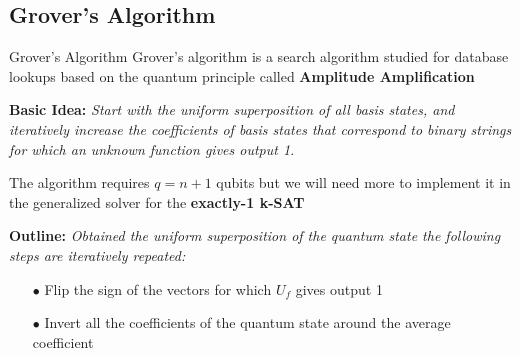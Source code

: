 	\subsection{Grover's Algorithm}
		\begin{frame}{Grover's Algorithm}
			\small
			Grover's algorithm is a search algorithm studied for database lookups based on the quantum principle called \textbf{Amplitude Amplification}\\
			
			\vspace{0.2cm}
			
			\textbf{Basic Idea:} \emph{Start with the uniform superposition of all basis states, and iteratively increase the coefficients of basis states that correspond to binary strings for which an unknown function gives output 1.}\\
			
			\vspace{0.3cm}
			
			The algorithm requires $q = n + 1$ qubits but we will need more to implement it in the generalized solver for the \textbf{exactly-1 k-SAT}\\
			
			\vspace{0.2cm}
			
			\textbf{Outline:} \emph{Obtained the uniform superposition of the quantum state the following steps are iteratively repeated:}
			\begin{itemize}
				\item[$\bullet$] Flip the sign of the vectors for which $U_f$ gives output 1
				\item[$\bullet$] Invert all the coefficients of the quantum state around the average coefficient
			\end{itemize}
		\end{frame}
	